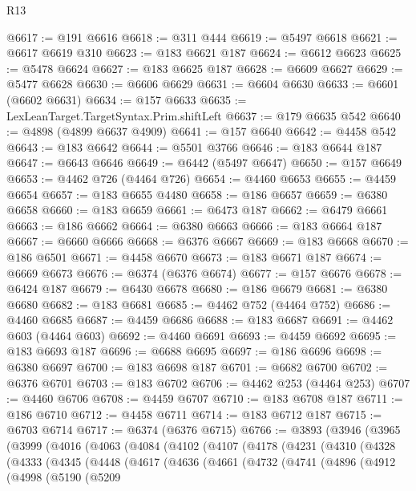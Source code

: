 \begin{lexlean}{R13}
\begin{coremodule}
@6617 := @191 @6616
@6618 := @311 @444
@6619 := @5497 @6618
@6621 := @6617 @6619 @310
@6623 := @183 @6621 @187
@6624 := @6612 @6623
@6625 := @5478 @6624
@6627 := @183 @6625 @187
@6628 := @6609 @6627
@6629 := @5477 @6628
@6630 := @6606 @6629
@6631 := @6604 @6630
@6633 := @6601 (@6602 @6631)
@6634 := @157 @6633
@6635 := LexLeanTarget.TargetSyntax.Prim.shiftLeft
@6637 := @179 @6635 @542
@6640 := @4898 (@4899 @6637 @4909)
@6641 := @157 @6640
@6642 := @4458 @542
@6643 := @183 @6642
@6644 := @5501 @3766
@6646 := @183 @6644 @187
@6647 := @6643 @6646
@6649 := @6442 (@5497 @6647)
@6650 := @157 @6649
@6653 := @4462 @726 (@4464 @726)
@6654 := @4460 @6653
@6655 := @4459 @6654
@6657 := @183 @6655 @4480
@6658 := @186 @6657
@6659 := @6380 @6658
@6660 := @183 @6659
@6661 := @6473 @187
@6662 := @6479 @6661
@6663 := @186 @6662
@6664 := @6380 @6663
@6666 := @183 @6664 @187
@6667 := @6660 @6666
@6668 := @6376 @6667
@6669 := @183 @6668
@6670 := @186 @6501
@6671 := @4458 @6670
@6673 := @183 @6671 @187
@6674 := @6669 @6673
@6676 := @6374 (@6376 @6674)
@6677 := @157 @6676
@6678 := @6424 @187
@6679 := @6430 @6678
@6680 := @186 @6679
@6681 := @6380 @6680
@6682 := @183 @6681
@6685 := @4462 @752 (@4464 @752)
@6686 := @4460 @6685
@6687 := @4459 @6686
@6688 := @183 @6687
@6691 := @4462 @603 (@4464 @603)
@6692 := @4460 @6691
@6693 := @4459 @6692
@6695 := @183 @6693 @187
@6696 := @6688 @6695
@6697 := @186 @6696
@6698 := @6380 @6697
@6700 := @183 @6698 @187
@6701 := @6682 @6700
@6702 := @6376 @6701
@6703 := @183 @6702
@6706 := @4462 @253 (@4464 @253)
@6707 := @4460 @6706
@6708 := @4459 @6707
@6710 := @183 @6708 @187
@6711 := @186 @6710
@6712 := @4458 @6711
@6714 := @183 @6712 @187
@6715 := @6703 @6714
@6717 := @6374 (@6376 @6715)
@6766 := @3893
    (@3946
      (@3965
        (@3999
          (@4016
            (@4063
              (@4084
                (@4102
                  (@4107
                    (@4178
                      (@4231
                        (@4310
                          (@4328
                            (@4333
                              (@4345
                                (@4448
                                  (@4617
                                    (@4636
                                      (@4661
                                        (@4732
                                          (@4741
                                            (@4896
                                              (@4912
                                                (@4998
                                                  (@5190
                                                    (@5209

\end{coremodule}
\end{lexlean}
